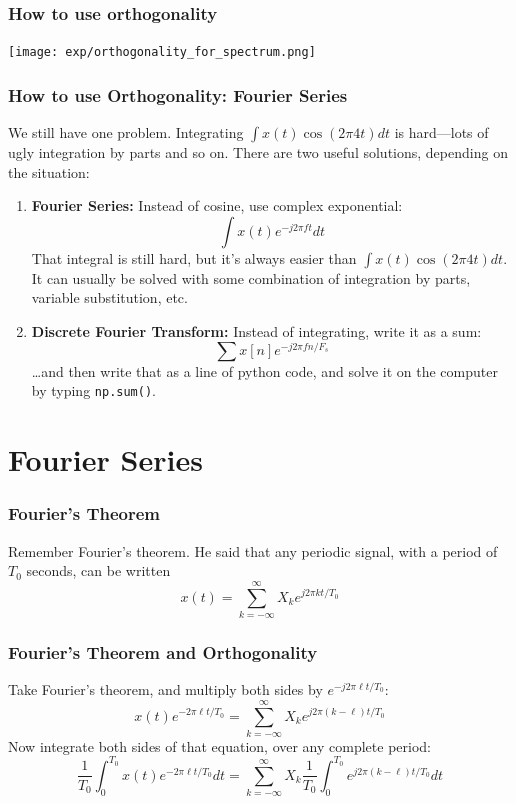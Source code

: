 \documentclass{beamer}
\begin{document}
\begin{frame}
  \frametitle{How to use orthogonality}
  \centerline{\texttt{[image: exp/orthogonality\_for\_spectrum.png]}}
\end{frame}

\begin{frame}
  \frametitle{How to use Orthogonality: Fourier Series}

  We still have one problem.  Integrating $\int x(t) \cos(2\pi 4t)dt$
  is hard---lots of ugly integration by parts and so on.  There are
  two useful solutions, depending on the situation:
  \begin{enumerate}
  \item {\bf Fourier Series:} Instead of cosine, use complex
    exponential:
    \[
    \int x(t) e^{-j2\pi ft} dt
    \]
    That integral is still hard, but it's always easier than $\int
    x(t) \cos(2\pi 4t)dt$.  It can usually be solved with some
    combination of integration by parts, variable substitution, etc.
  \item {\bf Discrete Fourier Transform:} Instead of integrating,
    write it as a sum:
    \[
    \sum x[n] e^{-j2\pi fn/F_s}
    \]
    \ldots and then write that as a line of python code, and solve it
    on the computer by typing {\tt np.sum()}.
  \end{enumerate}
\end{frame}
  
  
\section[Fourier Series]{Fourier Series}
\setcounter{subsection}{1}

\begin{frame}
  \frametitle{Fourier's Theorem}

  Remember Fourier's theorem.  He said that any periodic signal, with
  a period of $T_0$ seconds, can be written
  \[
  x(t) = \sum_{k=-\infty}^\infty X_k e^{j2\pi kt/T_0}
  \]
\end{frame}

\begin{frame}
  \frametitle{Fourier's Theorem and Orthogonality}

  Take Fourier's theorem, and multiply both sides by $e^{-j2\pi \ell t/T_0}$:
  \[
  x(t)e^{-2\pi\ell t/T_0} = \sum_{k=-\infty}^\infty X_k e^{j2\pi (k-\ell)t/T_0}
  \]
  Now integrate both sides of that equation, over any complete period:
  \[
  \frac{1}{T_0}\int_0^{T_0}x(t)e^{-2\pi\ell t/T_0}dt =
  \sum_{k=-\infty}^\infty X_k \frac{1}{T_0}\int_0^{T_0} e^{j2\pi (k-\ell)t/T_0}dt
  \]
\end{frame}
\end{document}
